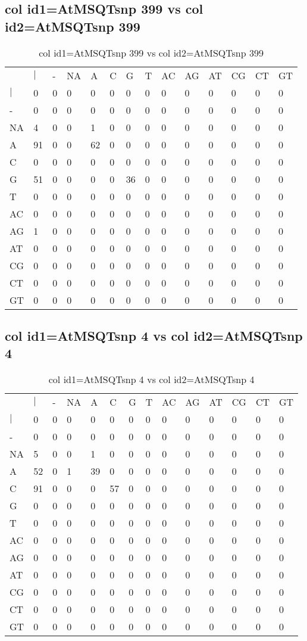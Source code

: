 \subsection{col id1=AtMSQTsnp 399 vs col id2=AtMSQTsnp 399}
\begin{center}
\begin{longtable}{|l|l|l|l|l|l|l|l|l|l|l|l|l|l|}
\caption{col id1=AtMSQTsnp 399 vs col id2=AtMSQTsnp 399} \label{table_dm720}\\
\hline
\\
\hline
&$|$&-&NA&A&C&G&T&AC&AG&AT&CG&CT&GT\\
$|$&0&0&0&0&0&0&0&0&0&0&0&0&0\\
-&0&0&0&0&0&0&0&0&0&0&0&0&0\\
NA&4&0&0&1&0&0&0&0&0&0&0&0&0\\
A&91&0&0&62&0&0&0&0&0&0&0&0&0\\
C&0&0&0&0&0&0&0&0&0&0&0&0&0\\
G&51&0&0&0&0&36&0&0&0&0&0&0&0\\
T&0&0&0&0&0&0&0&0&0&0&0&0&0\\
AC&0&0&0&0&0&0&0&0&0&0&0&0&0\\
AG&1&0&0&0&0&0&0&0&0&0&0&0&0\\
AT&0&0&0&0&0&0&0&0&0&0&0&0&0\\
CG&0&0&0&0&0&0&0&0&0&0&0&0&0\\
CT&0&0&0&0&0&0&0&0&0&0&0&0&0\\
GT&0&0&0&0&0&0&0&0&0&0&0&0&0\\
\hline
\end{longtable}
\end{center}

\subsection{col id1=AtMSQTsnp 4 vs col id2=AtMSQTsnp 4}
\begin{center}
\begin{longtable}{|l|l|l|l|l|l|l|l|l|l|l|l|l|l|}
\caption{col id1=AtMSQTsnp 4 vs col id2=AtMSQTsnp 4} \label{table_dm722}\\
\hline
\\
\hline
&$|$&-&NA&A&C&G&T&AC&AG&AT&CG&CT&GT\\
$|$&0&0&0&0&0&0&0&0&0&0&0&0&0\\
-&0&0&0&0&0&0&0&0&0&0&0&0&0\\
NA&5&0&0&1&0&0&0&0&0&0&0&0&0\\
A&52&0&1&39&0&0&0&0&0&0&0&0&0\\
C&91&0&0&0&57&0&0&0&0&0&0&0&0\\
G&0&0&0&0&0&0&0&0&0&0&0&0&0\\
T&0&0&0&0&0&0&0&0&0&0&0&0&0\\
AC&0&0&0&0&0&0&0&0&0&0&0&0&0\\
AG&0&0&0&0&0&0&0&0&0&0&0&0&0\\
AT&0&0&0&0&0&0&0&0&0&0&0&0&0\\
CG&0&0&0&0&0&0&0&0&0&0&0&0&0\\
CT&0&0&0&0&0&0&0&0&0&0&0&0&0\\
GT&0&0&0&0&0&0&0&0&0&0&0&0&0\\
\hline
\end{longtable}
\end{center}

